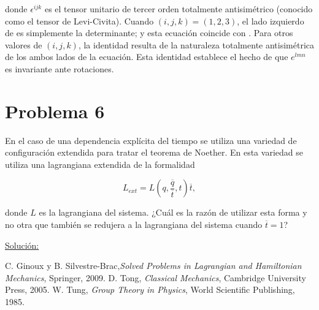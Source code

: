 \documentclass[a4paper,10pt]{article}
\numberwithin{equation}{section}
\begin{document}
donde $\epsilon^{ijk}$ es el tensor unitario de tercer orden totalmente antisimétrico (conocido 
como el tensor de Levi-Civita). Cuando $(i,j,k) = (1,2,3)$, el lado izquierdo 
de  es simplemente la determinante; y esta ecuación coincide con 
. Para otros valores de $(i,j,k)$, la identidad resulta de la naturaleza 
totalmente antisimétrica de los ambos lados de la ecuación. Esta identidad establece 
el hecho de que $e^{lmn}$ es invariante ante rotaciones. 





\section{Problema 6}

En el caso de una dependencia explícita del tiempo se utiliza una variedad de configuración 
extendida para tratar el teorema de Noether. En esta variedad se utiliza una lagrangiana 
extendida de la formalidad

$$
L_{ext} = L(q,\frac{\overline{q}}{\overline{t}},t)\overline{t},
$$

donde $L$ es la lagrangiana del sistema. ¿Cuál es la razón de utilizar esta forma y no 
otra que también se redujera a la lagrangiana del sistema cuando $\overline{t}=1$?

\vspace{.3cm}

\underline{Solución:} \vspace{.3cm}

\begin{thebibliography}{20}
C. Ginoux y B. Silvestre-Brac,\emph{Solved Problems in Lagrangian and Hamiltonian Mechanics},
Springer, 2009.
D. Tong, \emph{Classical Mechanics}, Cambridge University Press, 2005.
W. Tung, \emph{Group Theory in Physics}, World Scientific Publishing, 1985.
\end{thebibliography}
\end{document}
